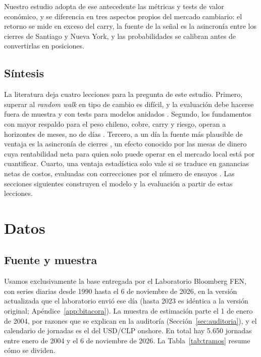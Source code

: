 \documentclass[11pt,a4paper]{article}
\begin{document}
Nuestro estudio adopta de ese antecedente las métricas y tests de valor económico, y se diferencia en tres aspectos propios del mercado cambiario: el retorno se mide en exceso del carry, la fuente de la señal es la asincronía entre los cierres de Santiago y Nueva York, y las probabilidades se calibran antes de convertirlas en posiciones.

\subsection{Síntesis}

La literatura deja cuatro lecciones para la pregunta de este estudio. Primero, superar al \emph{random walk} en tipo de cambio es difícil, y la evaluación debe hacerse fuera de muestra y con tests para modelos anidados \citep{meese1983,rossi2013}. Segundo, los fundamentos con mayor respaldo para el peso chileno, cobre, carry y riesgo, operan a horizontes de meses, no de días \citep{chen2010,lustig2011}. Tercero, a un día la fuente más plausible de ventaja es la asincronía de cierres \citep{lo1990}, un efecto conocido por las mesas de dinero cuya rentabilidad neta para quien solo puede operar en el mercado local está por cuantificar. Cuarto, una ventaja estadística solo vale si se traduce en ganancias netas de costos, evaluadas con correcciones por el número de ensayos \citep{bailey2014,gonzalez2026}. Las secciones siguientes construyen el modelo y la evaluación a partir de estas lecciones.

\newpage
\section{Datos}\label{sec:datos}

\subsection{Fuente y muestra}

Usamos exclusivamente la base entregada por el Laboratorio Bloomberg FEN, con series diarias desde 1990 hasta el 6 de noviembre de 2026, en la versión actualizada que el laboratorio envió ese día (hasta 2023 es idéntica a la versión original; Apéndice~\ref{app:bitacora}). La muestra de estimación parte el 1 de enero de 2004, por razones que se explican en la auditoría (Sección~\ref{sec:auditoria}), y el calendario de jornadas es el del USD/CLP onshore. En total hay 5.650 jornadas entre enero de 2004 y el 6 de noviembre de 2026. La Tabla~\ref{tab:tramos} resume cómo se dividen.
\end{document}
